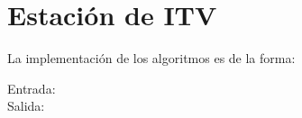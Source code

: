 \section{Estación de ITV}


La implementación de los algoritmos es de la forma:
\begin{description}
 \item[Entrada:] %
 \item[Salida:] %
\end{description}


